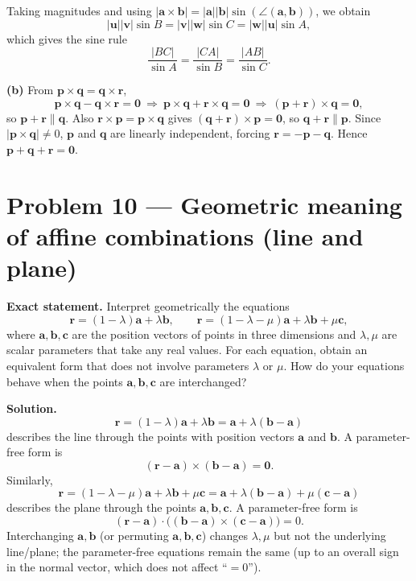 \documentclass[12pt,a4paper]{article}
\theoremstyle{plain}
\theoremstyle{definition}      %
\begin{document}
Taking magnitudes and using \(|\mathbf a\times\mathbf b|=|\mathbf a||\mathbf b|\sin(\angle(\mathbf a,\mathbf b))\),
we obtain
\[
|\mathbf u||\mathbf v|\sin B=|\mathbf v||\mathbf w|\sin C=|\mathbf w||\mathbf u|\sin A,
\]
which gives the sine rule
\[
\frac{|BC|}{\sin A}=\frac{|CA|}{\sin B}=\frac{|AB|}{\sin C}.
\]

\medskip
\noindent\textbf{(b)} From \(\mathbf p\times\mathbf q=\mathbf q\times\mathbf r\),
\[
\mathbf p\times\mathbf q-\mathbf q\times\mathbf r=\mathbf 0
\ \Longrightarrow\ 
\mathbf p\times\mathbf q+\mathbf r\times\mathbf q=\mathbf 0
\ \Longrightarrow\ 
(\mathbf p+\mathbf r)\times\mathbf q=\mathbf 0,
\]
so \(\mathbf p+\mathbf r\parallel \mathbf q\).
Also \(\mathbf r\times\mathbf p=\mathbf p\times\mathbf q\) gives \((\mathbf q+\mathbf r)\times\mathbf p=\mathbf 0\),
so \(\mathbf q+\mathbf r\parallel \mathbf p\).
Since \(|\mathbf p\times\mathbf q|\ne 0\), \(\mathbf p\) and \(\mathbf q\) are linearly independent, forcing
\(\mathbf r=-\mathbf p-\mathbf q\). Hence \(\mathbf p+\mathbf q+\mathbf r=\mathbf 0\).


\section*{Problem 10 — Geometric meaning of affine combinations (line and plane)}

\textbf{Exact statement.}
Interpret geometrically the equations
\[
\mathbf r=(1-\lambda)\mathbf a+\lambda \mathbf b,
\qquad
\mathbf r=(1-\lambda-\mu)\mathbf a+\lambda \mathbf b+\mu \mathbf c,
\]
where \(\mathbf a,\mathbf b,\mathbf c\) are the position vectors of points in three dimensions and \(\lambda,\mu\) are scalar parameters
that take any real values. For each equation, obtain an equivalent form that does not involve parameters \(\lambda\) or \(\mu\).
How do your equations behave when the points \(\mathbf a,\mathbf b,\mathbf c\) are interchanged?

\textbf{Solution.}
\[
\mathbf r=(1-\lambda)\mathbf a+\lambda \mathbf b=\mathbf a+\lambda(\mathbf b-\mathbf a)
\]
describes the line through the points with position vectors \(\mathbf a\) and \(\mathbf b\).
A parameter-free form is
\[
(\mathbf r-\mathbf a)\times(\mathbf b-\mathbf a)=\mathbf 0.
\]
Similarly,
\[
\mathbf r=(1-\lambda-\mu)\mathbf a+\lambda \mathbf b+\mu \mathbf c
=\mathbf a+\lambda(\mathbf b-\mathbf a)+\mu(\mathbf c-\mathbf a)
\]
describes the plane through the points \(\mathbf a,\mathbf b,\mathbf c\).
A parameter-free form is
\[
(\mathbf r-\mathbf a)\cdot\bigl((\mathbf b-\mathbf a)\times(\mathbf c-\mathbf a)\bigr)=0.
\]
Interchanging \(\mathbf a,\mathbf b\) (or permuting \(\mathbf a,\mathbf b,\mathbf c\)) changes \(\lambda,\mu\) but not the underlying
line/plane; the parameter-free equations remain the same (up to an overall sign in the normal vector, which does not affect ``\(=0\)'').
\end{document}
